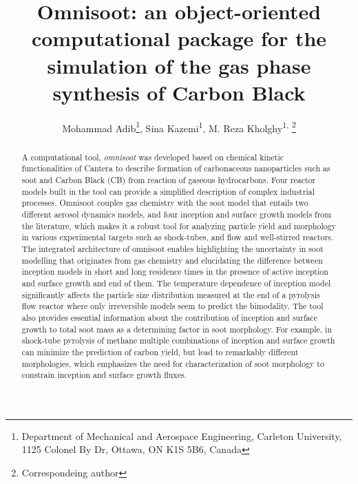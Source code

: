	\title{\renewcommand\baselinestretch{1}\bf
		Omnisoot: an object-oriented computational package for the simulation of the gas phase synthesis of Carbon Black
		}
	\renewcommand\baselinestretch{0.8}
	\author{
	Mohammad Adib\footnote{\scriptsize{Department of Mechanical and Aerospace Engineering, Carleton University, 1125 Colonel By Dr, Ottawa, ON K1S 5B6, Canada}},
	Sina Kazemi\textsuperscript{1}{\vspace{0.4em}},  
	M. Reza Kholghy\textsuperscript{1, }\footnote{\scriptsize{Correspondeing author}} 
}
	\date{}
	\maketitle
	\renewcommand\baselinestretch{1.3}
	
	\begin{abstract}
	A computational tool, \textit{omnisoot} was developed based on chemical kinetic functionalities of Cantera to describe formation of carbonaceous nanoparticles such as soot and Carbon Black (CB) from reaction of gaseous hydrocarbons. Four reactor models built in the tool can provide a simplified description of complex industrial processes. Omnisoot couples gas chemistry with the soot model that entails two different aerosol dynamics models, and four inception and surface growth models from the literature, which makes it a robust tool for analyzing particle yield and morphology in various experimental targets such as shock-tubes, and flow and well-stirred reactors. The integrated architecture of omnisoot enables highlighting the uncertainty in soot modelling that originates from gas chemistry and elucidating the difference between inception models in short and long residence times in the presence of active inception and surface growth and end of them. The temperature dependence of inception model significantly affects the particle size distribution measured at the end of a pyrolysis flow reactor where only irreversible models seem to predict the bimodality. The tool also provides essential information about the contribution of inception and surface growth to total soot mass as a determining factor in soot morphology. For example, in shock-tube pyrolysis of methane multiple combinations of inception and surface growth can minimize the prediction of carbon yield, but lead to remarkably different morphologies, which emphasizes the need for characterization of soot morphology to constrain inception and surface growth fluxes.
		
	\end{abstract}
	